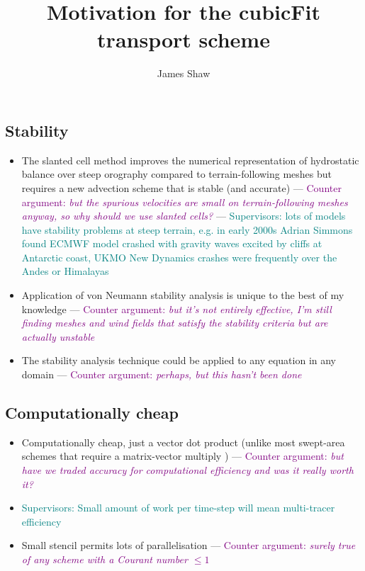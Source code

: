 \documentclass{article}
\title{Motivation for the cubicFit transport scheme}
\author{James Shaw}
\newcommand{\TODO}[1]{\textcolor{purple}{Counter argument: \emph{#1}}}
\newcommand{\svisor}[1]{\textcolor{teal}{Supervisors: #1}}
\begin{document}
\maketitle

\subsection*{Stability}

\begin{itemize}
	\item The slanted cell method improves the numerical representation of hydrostatic balance over steep orography compared to terrain-following meshes but requires a new advection scheme that is stable (and accurate) --- \TODO{but the spurious velocities are small on terrain-following meshes anyway, so why should we use slanted cells?} --- \svisor{lots of models have stability problems at steep terrain, e.g. in early 2000s Adrian Simmons found ECMWF model crashed with gravity waves excited by cliffs at Antarctic coast, UKMO New Dynamics crashes were frequently over the Andes or Himalayas}
	\item Application of von Neumann stability analysis is unique to the best of my knowledge --- \TODO{but it's not entirely effective, I'm still finding meshes and wind fields that satisfy the stability criteria but are actually unstable}
	\item The stability analysis technique could be applied to any equation in any domain --- \TODO{perhaps, but this hasn't been done}
\end{itemize}

\subsection*{Computationally cheap}

\begin{itemize}
	\item Computationally cheap, just a vector dot product (unlike most swept-area schemes that require a matrix-vector multiply \citep{lashley2002,skamarock-menchaca2010,thuburn2014}) --- \TODO{but have we traded accuracy for computational efficiency and was it really worth it?}
	\item \svisor{Small amount of work per time-step will mean multi-tracer efficiency}
	\item Small stencil permits lots of parallelisation --- \TODO{surely true of any scheme with a Courant number $\leq 1$}
\end{itemize}
\end{document}
